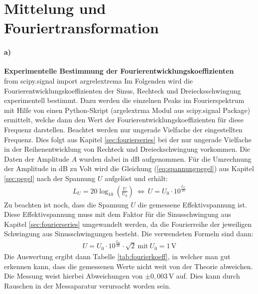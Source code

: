 
\section{Mittelung und Fouriertransformation}
\label{sec:mittelungAndTrafo}

\paragraph{a)}\textbf{Experimentelle Bestimmung der Fourierentwicklungskoeffizienten}\\
from scipy.signal import argrelextrema
Im Folgenden wird die Fourierentwicklungskoeffizienten der Sinus, Rechteck und Dreiecksschwingung experimentell bestimmt. Dazu werden die einzelnen Peaks im Fourierspektrum mit Hilfe von einen Python-Skript (argelextrma Modul aus scipy.signal Package) ermittelt, welche dann den Wert der Fourierentwicklungskoeffizienten für diese Frequenz darstellen. Beachtet werden nur ungerade Vielfache der eingestellten Frequenz. Dies folgt aus Kapitel \ref{sec:fourierseries} bei der nur ungerade Vielfache in der Reihenentwicklung von Rechteck und Dreieckschwingung vorkommen. Die Daten der Amplitude $A$ wurden dabei in dB aufgenommen. Für die Umrechnung der Amplitude in dB zu Volt wird die Gleichung (\ref{eq:spannungpegel}) aus Kapitel \ref{sec:pegel} nach der Spannung $U$ aufgelöst und erhält:
\begin{gather}
    L_U = 20 \log_{10}\left(\frac{U}{U_0}\right)~\Leftrightarrow~U = U_0 \cdot 10^{\frac{L_U}{20}}
\end{gather}
Zu beachten ist noch, dass die Spannung $U$ die gemessene Effektivspannung ist. Diese Effektivspannung muss mit dem Faktor für die Sinusschwingung aus Kapitel \ref{sec:fourierseries} umgewandelt werden, da die Fourierreihe der jeweiligen Schwingung aus Sinusschwingungen besteht. Die verwendeten Formeln sind dann:
\begin{gather}
    U = U_0 \cdot 10^{\frac{L_U}{20}} \cdot \sqrt{2}  ~\text{mit}~U_0=1\,\text{V}
    \label{eq:umrechnung}
\end{gather}
Die Auswertung ergibt dann Tabelle \ref{tab:fourierkoeff}, in welcher man gut erkennen kann, dass die gemessenen Werte nicht weit von der Theorie abweichen. Die Messung weist hierbei Abweichungen von $\pm0,003$\,V auf. Dies kann durch Rauschen in der Messaparatur verursacht worden sein.
\newpage
